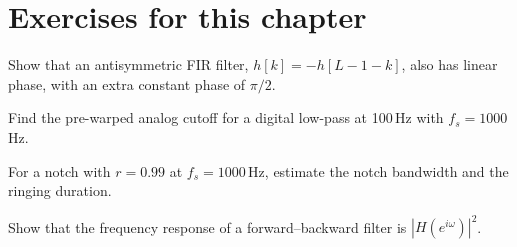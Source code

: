 \section*{Exercises for this chapter}
\begin{exercise}
Show that an antisymmetric FIR filter, $h[k]=-h[L-1-k]$, also has
linear phase, with an extra constant phase of $\pi/2$.
\end{exercise}
\begin{exercise}
Find the pre-warped analog cutoff for a digital low-pass at 100\,Hz with
$f_s=1000$\,Hz.
\end{exercise}
\begin{exercise}
For a notch with $r=0.99$ at $f_s=1000$\,Hz, estimate the notch
bandwidth and the ringing duration.
\end{exercise}
\begin{exercise}
Show that the frequency response of a forward--backward filter is
$|H(e^{i\omega})|^2$.
\end{exercise}
